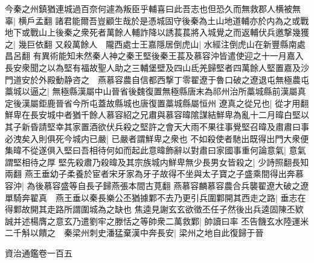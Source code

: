 今秦之州鎮猶連城過百奈何遽為叛臣乎輔喜曰此吾志也但恐久而無救郡人横被無辜|{
	横戶孟翻}
諸君能爾吾豈顧生哉於是憑城固守後秦為土山地道輔亦於内為之或戰地下或戰山上後秦之衆死者萬餘人輔詐降以誘萇萇將入城覺之而返輔伏兵邀撃幾獲之|{
	幾巨依翻}
又殺萬餘人　隴西處士王嘉隱居倒虎山|{
	水經注倒虎山在新豐縣南處昌呂翻}
有異術能知未然秦人神之秦王堅後秦王萇及慕容沖皆遣使迎之十一月嘉入長安衆聞之以為堅有福故聖人助之三輔堡壁及四山氐羌歸堅者四萬餘人堅置嘉及沙門道安於外殿動静咨之　燕慕容農自信都西撃丁零翟遼于魯口破之遼退屯無極農屯藁城以逼之|{
	無極縣漢屬中山晉省後魏復置無極縣唐末為祁州治所藁城縣前漢屬真定後漢屬鉅鹿晉省今所屯蓋故縣城也唐復置藁城縣屬恒州}
遼真之從兄也|{
	從才用翻}
鮮卑在長安城中者猶千餘人慕容紹之兄肅與慕容暐隂謀結鮮卑為亂十二月暐白堅以其子新昏請堅幸其家置酒欲伏兵殺之堅許之會天大雨不果往事覺堅召暐及肅肅曰事必洩矣入則俱死今城内已嚴|{
	已嚴者謂鮮卑之衆也}
不如殺使者馳出既得出門大衆便集暐不從遂俱入堅曰吾相待何如而起此意暐飾辭以對肅曰家國事重何論意氣|{
	意氣謂堅相待之厚}
堅先殺肅乃殺暐及其宗族城内鮮卑無少長男女皆殺之|{
	少詩照翻長知兩翻}
燕王垂幼子柔養於宦者宋牙家為牙子故得不坐與太子寶之子盛乘間得出奔慕容沖|{
	為後慕容盛等自長子歸燕張本間古莧翻}
燕慕容麟慕容農合兵襲翟遼大破之遼單騎奔翟真　燕王垂以秦長樂公丕猶據鄴不去乃更引兵圍鄴開其西走之路|{
	垂志在得鄴故開其走路所謂圍城為之缺也}
焦逵見謝玄玄欲徵丕任子然後出兵逵固陳丕欵誠并述楊膺之意玄乃遣劉牢之滕恬之等帥衆二萬救鄴|{
	帥讀曰率}
丕告饑玄水陸運米二千斛以饋之　秦梁州刺史潘猛棄漢中奔長安|{
	梁州之地自此復歸于晉}


資治通鑑卷一百五
